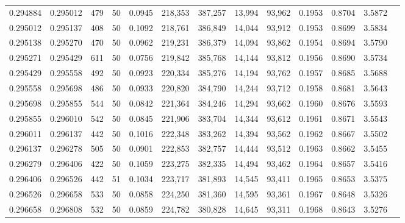 \begin{tabular}{rrrrrrrrrrrrr}
0.294884 & 0.295012 &   479 &  50 &                                     0.0945 & 218,353 & 387,257 &  13,994 &  93,962 & 0.1953 & 0.8704 & 3.5872 \\
0.295012 & 0.295137 &   408 &  50 &                                     0.1092 & 218,761 & 386,849 &  14,044 &  93,912 & 0.1953 & 0.8699 & 3.5834 \\
0.295138 & 0.295270 &   470 &  50 &                                     0.0962 & 219,231 & 386,379 &  14,094 &  93,862 & 0.1954 & 0.8694 & 3.5790 \\
0.295271 & 0.295429 &   611 &  50 &                                     0.0756 & 219,842 & 385,768 &  14,144 &  93,812 & 0.1956 & 0.8690 & 3.5734 \\
0.295429 & 0.295558 &   492 &  50 &                                     0.0923 & 220,334 & 385,276 &  14,194 &  93,762 & 0.1957 & 0.8685 & 3.5688 \\
0.295558 & 0.295698 &   486 &  50 &                                     0.0933 & 220,820 & 384,790 &  14,244 &  93,712 & 0.1958 & 0.8681 & 3.5643 \\
0.295698 & 0.295855 &   544 &  50 &                                     0.0842 & 221,364 & 384,246 &  14,294 &  93,662 & 0.1960 & 0.8676 & 3.5593 \\
0.295855 & 0.296010 &   542 &  50 &                                     0.0845 & 221,906 & 383,704 &  14,344 &  93,612 & 0.1961 & 0.8671 & 3.5543 \\
0.296011 & 0.296137 &   442 &  50 &                                     0.1016 & 222,348 & 383,262 &  14,394 &  93,562 & 0.1962 & 0.8667 & 3.5502 \\
0.296137 & 0.296278 &   505 &  50 &                                     0.0901 & 222,853 & 382,757 &  14,444 &  93,512 & 0.1963 & 0.8662 & 3.5455 \\
0.296279 & 0.296406 &   422 &  50 &                                     0.1059 & 223,275 & 382,335 &  14,494 &  93,462 & 0.1964 & 0.8657 & 3.5416 \\
0.296406 & 0.296526 &   442 &  51 &                                     0.1034 & 223,717 & 381,893 &  14,545 &  93,411 & 0.1965 & 0.8653 & 3.5375 \\
0.296526 & 0.296658 &   533 &  50 &                                     0.0858 & 224,250 & 381,360 &  14,595 &  93,361 & 0.1967 & 0.8648 & 3.5326 \\
0.296658 & 0.296808 &   532 &  50 &                                     0.0859 & 224,782 & 380,828 &  14,645 &  93,311 & 0.1968 & 0.8643 & 3.5276 \\

\end{tabular}
